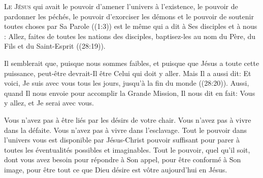 



\lettrine{L}{e Jésus} qui avait le pouvoir d'amener l'univers
 à l'existence, le pouvoir de pardonner les péchés,
 le pouvoir d'exorciser les démons et le pouvoir de soutenir
 toutes choses par Sa Parole ((1:3))
 est le même qui a dit à Ses disciples \ocadr et à nous \fcadr{}: 
 \Og Allez, faites de toutes les nations des disciples,
 baptisez-les au nom du Père, du Fils et du Saint-Esprit \Fg{}
 ((28:19)). 

Il semblerait que, puisque nous sommes faibles, et puisque que Jésus
 a toute cette puissance, peut-être devrait-Il être Celui qui doit y aller.
 Mais Il a aussi dit: 
 \Og Et voici, Je suis avec vous tous les jours,
 jusqu'à la fin du monde \Fg{} ((28:20)).
 Aussi, quand Il nous envoie pour accomplir la Grande Mission,
 Il nous dit en fait: 
 \Og Vous y allez, et Je serai avec vous. \Fg{}



Vous n'avez pas à être liés par les désirs de votre chair.
 Vous n'avez pas à vivre dans la défaite. Vous n'avez pas à vivre
 dans l'esclavage. Tout le pouvoir dans l'univers vous est disponible
 par Jésus-Christ \ocadr pouvoir suffisant pour parer à toutes
 les éventualités possibles et imaginables.
 Tout le pouvoir, quel qu'il soit, dont vous avez besoin
 pour répondre à Son appel, pour être conformé à Son image,
 pour être tout ce que Dieu désire est vôtre aujourd'hui en Jésus. 

\dvrule



